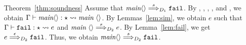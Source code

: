 \begin{pfof}{Theorem~\ref{thm:soundness}}
Assume that \(\textit{main}\langle{}\rangle \stackrel{s}{\Longrightarrow}_{D_1} \mathtt{fail}\).
%
By , , , , and , we obtain
\(\T{\Gamma}{\textit{main}\tuple{}}{\TUNIT}{\textit{main}\ \tuple{}}\).
%
By Lemmas~\ref{lem:sim}, we obtain \(e\) such that
\(\Gamma \vdash \mathtt{fail} : \star \leadsto e\) and
\(\textit{main}\ \langle{}\rangle \stackrel{s}{\Longrightarrow}_{D_2} e\).
%
By Lemma~\ref{lem:fail}, we get \(e \stackrel{\epsilon}{\Longrightarrow}_{D_2} \mathtt{fail}\).
Thus, we obtain \(\textit{main}\langle{}\rangle \stackrel{s}{\Longrightarrow}_{D_2} \mathtt{fail}\).
\end{pfof}
